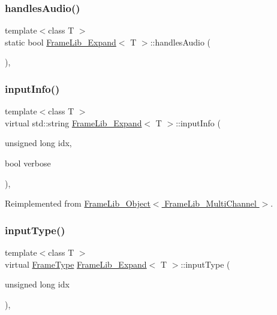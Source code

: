 \subsubsection{\texorpdfstring{handles\+Audio()}{handlesAudio()}}
{\footnotesize\ttfamily template$<$class T $>$ \\
static bool \hyperlink{class_frame_lib___expand}{Frame\+Lib\+\_\+\+Expand}$<$ T $>$\+::handles\+Audio (\begin{DoxyParamCaption}{ }\end{DoxyParamCaption})\hspace{0.3cm}{\ttfamily [inline]}, {\ttfamily [static]}}

\mbox{\label{class_frame_lib___expand_ab9017c7fe8562857609fcf819b7d1cdd}} 
\subsubsection{\texorpdfstring{input\+Info()}{inputInfo()}}
{\footnotesize\ttfamily template$<$class T $>$ \\
virtual std\+::string \hyperlink{class_frame_lib___expand}{Frame\+Lib\+\_\+\+Expand}$<$ T $>$\+::input\+Info (\begin{DoxyParamCaption}\item[{unsigned long}]{idx,  }\item[{bool}]{verbose }\end{DoxyParamCaption})\hspace{0.3cm}{\ttfamily [inline]}, {\ttfamily [virtual]}}



Reimplemented from \hyperlink{class_frame_lib___object_a49abea5f18125c425b1eae8710735891}{Frame\+Lib\+\_\+\+Object$<$ Frame\+Lib\+\_\+\+Multi\+Channel $>$}.

\mbox{\label{class_frame_lib___expand_af7de1e520ecd39d62290278235f8ff45}} 
\subsubsection{\texorpdfstring{input\+Type()}{inputType()}}
{\footnotesize\ttfamily template$<$class T $>$ \\
virtual \hyperlink{_frame_lib___types_8h_ad495a9f61af7fff07d7e97979d1ab854}{Frame\+Type} \hyperlink{class_frame_lib___expand}{Frame\+Lib\+\_\+\+Expand}$<$ T $>$\+::input\+Type (\begin{DoxyParamCaption}\item[{unsigned long}]{idx }\end{DoxyParamCaption})\hspace{0.3cm}{\ttfamily [inline]}, {\ttfamily [virtual]}}



